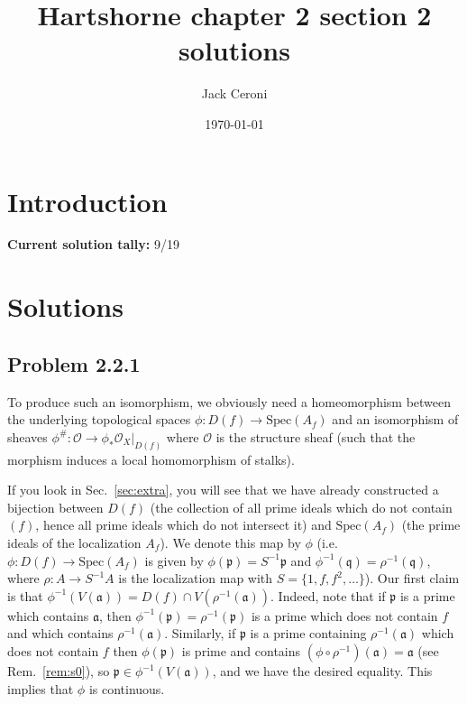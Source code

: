 \documentclass[aps,pra,showpacs,notitlepage,onecolumn,superscriptaddress,nofootinbib]{revtex4-1}
\theoremstyle{definition}
\newcommand{\hhrulefill}{\hspace{-1.5em} \hrulefill}
\begin{document}
\title{Hartshorne chapter 2 section 2 solutions}
\author{Jack Ceroni}
\date{\today}
\maketitle


\tableofcontents

\hhrulefill

\section{Introduction}

\noindent \textbf{Current solution tally:} 9/19

\section{Solutions}

\subsection{Problem 2.2.1}

\noindent To produce such an isomorphism, we obviously need a homeomorphism between the underlying topological spaces
  $\phi : D(f) \rightarrow \text{Spec}(A_f)$ and an isomorphism of sheaves $\phi^{\#} : \mathcal{O} \rightarrow \phi_{*} \mathcal{O}_X|_{D(f)}$
  where $\mathcal{O}$ is the structure sheaf (such that the morphism induces a local homomorphism of stalks).

  If you look in Sec.~\ref{sec:extra}, you will see that we have already constructed a bijection between $D(f)$ (the collection of all prime ideals which do not contain $(f)$, hence all prime
  ideals which do not intersect it) and $\text{Spec}(A_f)$
  (the prime ideals of the localization $A_f$). We denote this map by $\phi$ (i.e. $\phi : D(f) \rightarrow \text{Spec}(A_f)$ is given by $\phi(\mathfrak{p}) = S^{-1} \mathfrak{p}$ and $\phi^{-1}(\mathfrak{q}) = \rho^{-1}(\mathfrak{q})$,
  where $\rho : A \rightarrow S^{-1} A$ is the localization map with $S = \{1, f, f^2, \dots\}$). Our first claim is that $\phi^{-1}(V(\mathfrak{a})) = D(f) \cap V(\rho^{-1}(\mathfrak{a}))$. Indeed, note that if $\mathfrak{p}$ is a prime
  which contains $\mathfrak{a}$, then $\phi^{-1}(\mathfrak{p}) = \rho^{-1}(\mathfrak{p})$ is a prime which does not contain $f$ and which contains $\rho^{-1}(\mathfrak{a})$. Similarly, if $\mathfrak{p}$ is a prime containing
  $\rho^{-1}(\mathfrak{a})$ which does not contain $f$ then $\phi(\mathfrak{p})$ is prime and contains $(\phi \circ \rho^{-1})(\mathfrak{a}) = \mathfrak{a}$ (see Rem.~\ref{rem:s0}),
  so $\mathfrak{p} \in \phi^{-1}(V(\mathfrak{a}))$, and we have the desired equality. This implies that $\phi$ is continuous.
\end{document}
